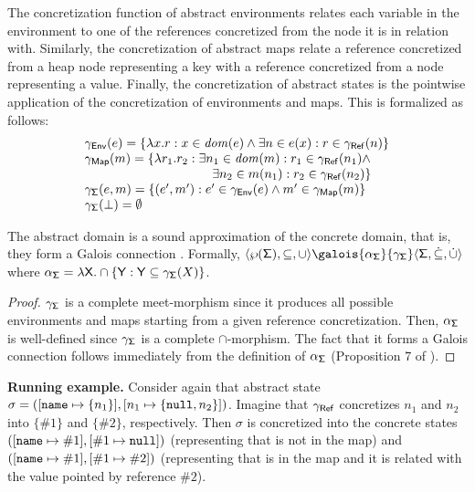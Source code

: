 The concretization function of abstract environments relates each variable in the environment to one of the references concretized from the node it is in relation with. Similarly, the concretization of abstract maps relate a reference concretized from a heap node representing a key with a reference concretized from a node representing a value. Finally, the concretization of abstract states is the pointwise application of the concretization of environments and maps. This is formalized as follows:
\footnotesize
\[
\begin{array}{l}
\gamma_\env(e) = \{\lambda x . r : x \in \dom{e} \land \exists n \in e(x) : r \in \gamma_\reference(n)\}\\
\gamma_\map(m) = \{\lambda r_1 . r_2 : \exists n_1 \in \dom{m} : r_1 \in \gamma_\reference(n_1) \land\\
\hspace{100pt} \exists n_2 \in m(n_1) : r_2 \in \gamma_\reference(n_2) \}\\
\gamma_\state(e, m) = \{(e', m') : e' \in \gamma_\env(e) \land m' \in \gamma_\map(m)\}\\
\gamma_\state(\bot) =\emptyset\\
\end{array}
\]
\normalsize
\begin{lemma}
	The abstract domain is a sound approximation of the concrete domain, that is, they form a Galois connection \cite{CC77}. Formally, $\langle \wp(\state), \subseteq, \cup \rangle \galois{\alpha_\state}{\gamma_\state} \langle \astate, \dot{\subseteq}, \dot{\cup} \rangle$ where $\alpha_{\mathsf{\Sigma}} = \lambda \mathsf{X} . \cap \{\mathsf{Y} : \mathsf{Y} \subseteq \gamma_{\mathsf{\Sigma}}(X)\}$.
\end{lemma}
\begin{proof}

$\gamma_{\mathsf{\Sigma}}$ is a complete meet-morphism since it produces all possible environments and maps starting from a given reference concretization. Then, $\alpha_{\mathsf{\Sigma}}$ is well-defined since $\gamma_{\mathsf{\Sigma}}$ is a complete $\cap$-morphism. The fact that it forms a Galois connection follows immediately from the definition of $\alpha_{\mathsf{\Sigma}}$ (Proposition 7 of \cite{CC92}).
\end{proof}


\noindent \textbf{Running example.} Consider again that abstract state $\sigma = ([\mathtt{name} \mapsto \{n_1\}], [n_1 \mapsto \{\mathtt{null}, n_2\}])$. Imagine that $\gamma_{\mathsf{Ref}}$ concretizes $n_1$ and $n_2$ into $\{\#1\}$ and $\{\#2\}$, respectively. Then $\sigma$ is concretized into the concrete states $([\mathtt{name} \mapsto \#1], [\#1 \mapsto \mathtt{null}])$ (representing that  is not in the map) and $([\mathtt{name} \mapsto \#1], [\#1 \mapsto \#2])$ (representing that  is in the map and it is related with the value pointed by reference $\#2$).




